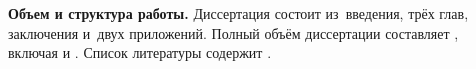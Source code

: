 \textbf{Объем и структура работы.} Диссертация состоит из~введения, трёх глав,
заключения и~двух приложений.
%
Полный объём диссертации составляет
, включая
 и
.   Список литературы содержит
.
